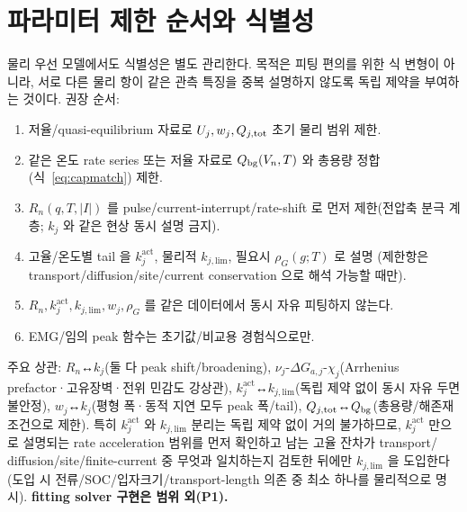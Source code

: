 \section{파라미터 제한 순서와 식별성}\label{sec:ident}
물리 우선 모델에서도 식별성은 별도 관리한다. 목적은 피팅 편의를 위한 식 변형이 아니라, 서로 다른 물리
항이 같은 관측 특징을 중복 설명하지 않도록 독립 제약을 부여하는 것이다. 권장 순서:
\begin{enumerate}[label=\arabic*),leftmargin=2.0em]
\item 저율/quasi-equilibrium 자료로 $U_j,w_j,Q_{j,\mathrm{tot}}$ 초기 물리 범위 제한.
\item 같은 온도 rate series 또는 저율 자료로 $Q_{\mathrm{bg}}(V_n,T)$ 와 총용량 정합(식~\eqref{eq:capmatch}) 제한.
\item $R_n(q,T,|I|)$ 를 pulse/current-interrupt/rate-shift 로 먼저 제한(전압축 분극 계층; $k_j$ 와 같은
  현상 동시 설명 금지).
\item 고율/온도별 tail 을 $k_j^\mathrm{act}$, 물리적 $k_{j,\mathrm{lim}}$, 필요시 $\rho_G(g;T)$ 로 설명
  (제한항은 transport/diffusion/site/current conservation 으로 해석 가능할 때만).
\item $R_n,k_j^\mathrm{act},k_{j,\mathrm{lim}},w_j,\rho_G$ 를 같은 데이터에서 동시 자유 피팅하지 않는다.
\item EMG/임의 peak 함수는 초기값/비교용 경험식으로만.
\end{enumerate}
주요 상관: $R_n$↔$k_j$(둘 다 peak shift/broadening), $\nu_j$-$\Delta G_{a,j}$-$\chi_j$(Arrhenius
prefactor·고유장벽·전위 민감도 강상관), $k_j^\mathrm{act}$↔$k_{j,\mathrm{lim}}$(독립 제약 없이 동시
자유 두면 불안정), $w_j$↔$k_j$(평형 폭·동적 지연 모두 peak 폭/tail), $Q_{j,\mathrm{tot}}$↔$Q_{\mathrm{bg}}$(총용량/해존재
조건으로 제한). 특히 $k_j^\mathrm{act}$ 와 $k_{j,\mathrm{lim}}$ 분리는 독립 제약 없이 거의 불가하므로,
$k_j^\mathrm{act}$ 만으로 설명되는 rate acceleration 범위를 먼저 확인하고 남는 고율 잔차가 transport/
diffusion/site/finite-current 중 무엇과 일치하는지 검토한 뒤에만 $k_{j,\mathrm{lim}}$ 을 도입한다(도입 시
전류/SOC/입자크기/transport-length 의존 중 최소 하나를 물리적으로 명시). \textbf{fitting solver 구현은
범위 외(P1).}

